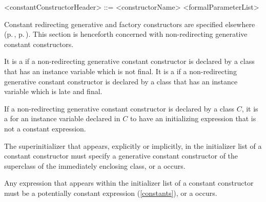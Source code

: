 \documentclass[makeidx]{article}
\begin{document}
\begin{grammar}
<constantConstructorHeader> ::= \gnewline{}
  \CONST{} <constructorName> <formalParameterList>
\end{grammar}


\LMHash{}%
Constant redirecting generative and factory constructors are specified elsewhere
(p.\,\pageref{redirectingGenerativeConstructors},
p.\,\pageref{redirectingFactoryConstructors}).
This section is henceforth concerned with
non-redirecting generative constant constructors.

\LMHash{}%
It is a
 if a non-redirecting generative constant constructor
is declared by a class that has an instance variable which is not final.
It is a
 if a non-redirecting generative constant constructor
is declared by a class that has an instance variable which is late and final.


\LMHash{}%
If a non-redirecting generative constant constructor 
is declared by a class $C$,
it is a 
for an instance variable declared in $C$
to have an initializing expression that is not a constant expression.


\LMHash{}%
The superinitializer that appears, explicitly or implicitly,
in the initializer list of a constant constructor
must specify a generative constant constructor of
the superclass of the immediately enclosing class,
or a  occurs.

\LMHash{}%
Any expression that appears within
the initializer list of a constant constructor
must be a potentially constant expression
(\ref{constants}),
or a  occurs.
\end{document}
